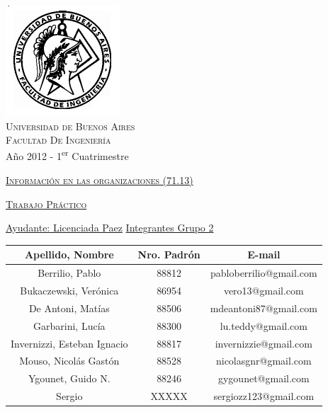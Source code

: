 \documentclass[12pt,titlepage]{report}
\begin{document}
\begin{titlepage}

\thispagestyle{empty}

\begin{center}
\includegraphics[scale=0.55]{./Images/fiuba}\\
\large{\textsc{Universidad de Buenos Aires}}\\
\large{\textsc{Facultad De Ingeniería}}\\
\small{Año 2012 - 1\textsuperscript{er} Cuatrimestre}
\end{center}

\vfill

\begin{center}

\Large{\underline{\textsc{Información en las organizaciones (71.13)}}}

\vfill


\Large{\underline{\textsc{Trabajo Práctico}}}
\vfill

\Large\underline{Ayudante: Licenciada Paez} \linebreak\linebreak
\Large\underline{Integrantes Grupo 2} \linebreak\linebreak

\large\addtolength{\tabcolsep}{-3pt}
\begin{tabular}{|| c | c | c ||}
\hline
\textbf{Apellido, Nombre} & \textbf{Nro. Padrón} & \textbf{E-mail} \\
\hline
Berrilio, Pablo & 88812 & pabloberrilio@gmail.com \\
\hline
Bukaczewski, Verónica & 86954 & vero13@gmail.com \\
\hline
De Antoni, Matías & 88506 & mdeantoni87@gmail.com \\
\hline
Garbarini, Lucía & 88300 & lu.teddy@gmail.com\\
\hline
Invernizzi, Esteban Ignacio & 88817 & invernizzie@gmail.com\\
\hline
Mouso, Nicolás Gastón & 88528 & nicolasgnr@gmail.com \\
\hline
Ygounet, Guido N. & 88246 & gygounet@gmail.com \\
\hline
Sergio & XXXXX & sergiozz123@gmail.com \\
\hline
\end{tabular}
\end{center}


\end{titlepage}
\end{document}
